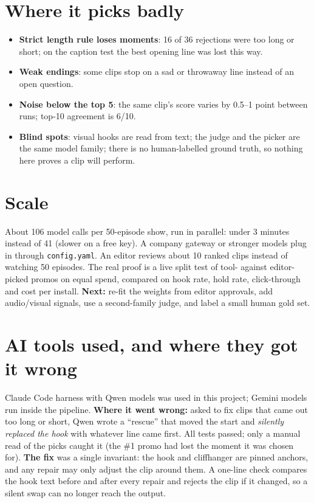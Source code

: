 \documentclass[10pt]{article}
\begin{document}
\section{Where it picks badly}
\begin{itemize}
\item \textbf{Strict length rule loses moments}: 16 of 36 rejections were too long or short; on the caption test the best
opening line was lost this way.
\item \textbf{Weak endings}: some clips stop on a sad or throwaway line instead of an open question.
\item \textbf{Noise below the top 5}: the same clip's score varies by 0.5--1 point between runs; top-10 agreement is 6/10.
\item \textbf{Blind spots}: visual hooks are read from text; the judge and the picker are the same model family; there is
no human-labelled ground truth, so nothing here proves a clip will perform.
\end{itemize}

\section{Scale}
About 106 model calls per 50-episode show, run in parallel: under 3 minutes instead of 41 (slower on a free key).
A company gateway or stronger models plug in through \texttt{config.yaml}. An editor reviews about 10 ranked clips
instead of watching 50 episodes. The real proof is a live split test of tool- against editor-picked promos on equal
spend, compared on hook rate, hold rate, click-through and cost per install. \textbf{Next:} re-fit the weights from
editor approvals, add audio/visual signals, use a second-family judge, and label a small human gold set.

\section{AI tools used, and where they got it wrong}
Claude Code harness with Qwen models was used in this project; Gemini models run inside the pipeline.
\textbf{Where it went wrong:} asked to fix clips that came out too long or short, Qwen wrote a ``rescue'' that moved
the start and \emph{silently replaced the hook} with whatever line came first. All tests passed; only a manual read of
the picks caught it (the \#1 promo had lost the moment it was chosen for). \textbf{The fix} was a single invariant:
the hook and cliffhanger are pinned anchors, and any repair may only adjust the clip around them. A one-line check
compares the hook text before and after every repair and rejects the clip if it changed, so a silent swap can no
longer reach the output.
\end{document}
